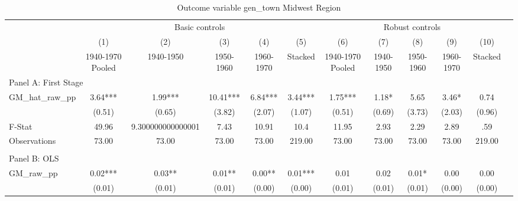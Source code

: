  \begin{table}[htbp]\centering {} \begin{threeparttable} \caption{Outcome variable gen\_town Midwest Region} \begin{tabular}{l*{11}{c}} \toprule
          &\multicolumn{5}{c}{Basic controls}                                   &\multicolumn{5}{c}{Robust controls}                                  \\\cmidrule(lr){2-6}\cmidrule(lr){7-11}
          &\multicolumn{1}{c}{(1)}&\multicolumn{1}{c}{(2)}&\multicolumn{1}{c}{(3)}&\multicolumn{1}{c}{(4)}&\multicolumn{1}{c}{(5)}&\multicolumn{1}{c}{(6)}&\multicolumn{1}{c}{(7)}&\multicolumn{1}{c}{(8)}&\multicolumn{1}{c}{(9)}&\multicolumn{1}{c}{(10)}\\
          &\multicolumn{1}{c}{1940-1970 Pooled}&\multicolumn{1}{c}{1940-1950}&\multicolumn{1}{c}{1950-1960}&\multicolumn{1}{c}{1960-1970}&\multicolumn{1}{c}{Stacked}&\multicolumn{1}{c}{1940-1970 Pooled}&\multicolumn{1}{c}{1940-1950}&\multicolumn{1}{c}{1950-1960}&\multicolumn{1}{c}{1960-1970}&\multicolumn{1}{c}{Stacked}\\
\cmidrule(lr){1-11}
\multicolumn{10}{l}{Panel A: First Stage}\\
\cmidrule(lr){1-11}
GM\_hat\_raw\_pp&      3.64***&      1.99***&     10.41***&      6.84***&      3.44***&      1.75***&      1.18*  &      5.65   &      3.46*  &      0.74   \\
          &    (0.51)   &    (0.65)   &    (3.82)   &    (2.07)   &    (1.07)   &    (0.51)   &    (0.69)   &    (3.73)   &    (2.03)   &    (0.96)   \\
\midrule
F-Stat    &     49.96   &9.300000000000001   &      7.43   &     10.91   &      10.4   &     11.95   &      2.93   &      2.29   &      2.89   &       .59   \\
Observations&     73.00   &     73.00   &     73.00   &     73.00   &    219.00   &     73.00   &     73.00   &     73.00   &     73.00   &    219.00   \\
\cmidrule[\heavyrulewidth](lr){1-11} \\ \cmidrule[\heavyrulewidth](lr){1-11}
\multicolumn{10}{l}{Panel B: OLS}\\
\cmidrule(lr){1-11}
GM\_raw\_pp &      0.02***&      0.03** &      0.01** &      0.00** &      0.01***&      0.01   &      0.02   &      0.01*  &      0.00   &      0.00   \\
          &    (0.01)   &    (0.01)   &    (0.01)   &    (0.00)   &    (0.00)   &    (0.01)   &    (0.01)   &    (0.01)   &    (0.00)   &    (0.00)   \\

\end{tabular}
\end{threeparttable}
\end{table}
